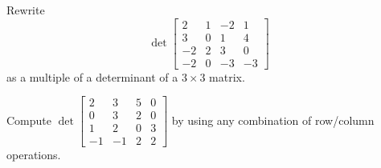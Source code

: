 \begin{activity}{10}
Rewrite \[\det \begin{bmatrix} 2 & 1 & -2 & 1 \\ 3 & 0 & 1 & 4 \\ -2 & 2 & 3 & 0 \\ -2 & 0 & -3 & -3 \end{bmatrix} \] as a multiple of a determinant of a \(3\times3\) matrix.
\end{activity}


\begin{activity}{10}
  Compute 
  \(
    \det\begin{bmatrix} 
      2 & 3 & 5 & 0 \\ 
      0 & 3 & 2 & 0 \\ 
      1 & 2 & 0 & 3 \\ 
      -1 & -1 & 2 & 2 
    \end{bmatrix}
  \) by using any combination of row/column operations.
\end{activity}

